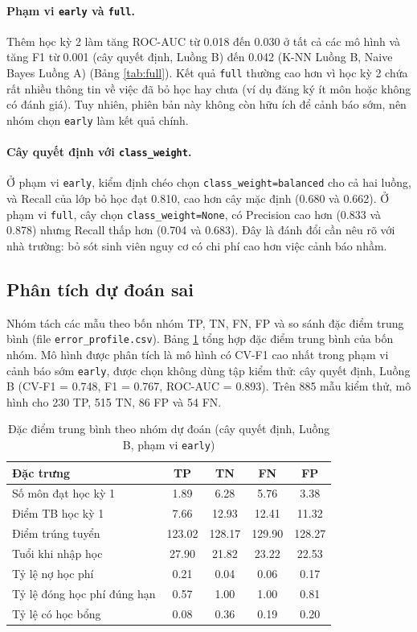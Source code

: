 \documentclass[12pt,a4paper]{article}
\begin{document}
\paragraph{Phạm vi \texttt{early} và \texttt{full}.} Thêm học kỳ 2 làm tăng ROC-AUC từ 0.018 đến 0.030 ở tất cả các mô hình và tăng F1 từ 0.001 (cây quyết định, Luồng B) đến 0.042 (K-NN Luồng B, Naive Bayes Luồng A) (Bảng \ref{tab:full}). Kết quả \texttt{full} thường cao hơn vì học kỳ 2 chứa rất nhiều thông tin về việc đã bỏ học hay chưa (ví dụ đăng ký ít môn hoặc không có đánh giá). Tuy nhiên, phiên bản này không còn hữu ích để cảnh báo sớm, nên nhóm chọn \texttt{early} làm kết quả chính.

\paragraph{Cây quyết định với \texttt{class\_weight}.} Ở phạm vi \texttt{early}, kiểm định chéo chọn \texttt{class\_weight=balanced} cho cả hai luồng, và Recall của lớp bỏ học đạt 0.810, cao hơn cây mặc định (0.680 và 0.662). Ở phạm vi \texttt{full}, cây chọn \texttt{class\_weight=None}, có Precision cao hơn (0.833 và 0.878) nhưng Recall thấp hơn (0.704 và 0.683). Đây là đánh đổi cần nêu rõ với nhà trường: bỏ sót sinh viên nguy cơ có chi phí cao hơn việc cảnh báo nhầm.

\subsection{Phân tích dự đoán sai}
Nhóm tách các mẫu theo bốn nhóm TP, TN, FN, FP và so sánh đặc điểm trung bình (file \texttt{error\_profile.csv}). Bảng \ref{tab:err} tổng hợp đặc điểm trung bình của bốn nhóm. Mô hình được phân tích là mô hình có CV-F1 cao nhất trong phạm vi cảnh báo sớm \texttt{early}, được chọn không dùng tập kiểm thử: cây quyết định, Luồng B (CV-F1 = 0.748, F1 = 0.767, ROC-AUC = 0.893). Trên 885 mẫu kiểm thử, mô hình cho 230 TP, 515 TN, 86 FP và 54 FN.

\begin{table}[H]
\centering
\caption{Đặc điểm trung bình theo nhóm dự đoán (cây quyết định, Luồng B, phạm vi \texttt{early})}
\label{tab:err}
\begin{tabular}{lcccc}
\toprule
Đặc trưng & TP & TN & FN & FP \\
\midrule
Số môn đạt học kỳ 1 & 1.89 & 6.28 & 5.76 & 3.38 \\
Điểm TB học kỳ 1 & 7.66 & 12.93 & 12.41 & 11.32 \\
Điểm trúng tuyển & 123.02 & 128.17 & 129.90 & 128.27 \\
Tuổi khi nhập học & 27.90 & 21.82 & 23.22 & 22.53 \\
Tỷ lệ nợ học phí & 0.21 & 0.04 & 0.06 & 0.17 \\
Tỷ lệ đóng học phí đúng hạn & 0.57 & 1.00 & 1.00 & 0.81 \\
Tỷ lệ có học bổng & 0.08 & 0.36 & 0.19 & 0.20 \\
\bottomrule
\end{tabular}
\end{table}
\end{document}
